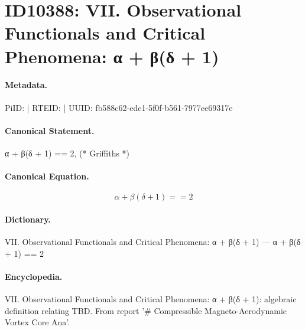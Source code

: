\section*{ID10388: VII. Observational Functionals and Critical Phenomena: α + β(δ + 1)}
\paragraph{Metadata.}
PiID:  | RTEID:  | UUID: fb588c62-ede1-5f0f-b561-7977ee69317e

\paragraph{Canonical Statement.}
α + β(δ + 1) == 2, (* Griffiths *)

\paragraph{Canonical Equation.}
\[
α + β(δ + 1) == 2
\]

\paragraph{Dictionary.}
VII. Observational Functionals and Critical Phenomena: α + β(δ + 1) — α + β(δ + 1) == 2

\paragraph{Encyclopedia.}
VII. Observational Functionals and Critical Phenomena: α + β(δ + 1): algebraic definition relating TBD. From report '\# Compressible Magneto-Aerodynamic Vortex Core Ana'.
